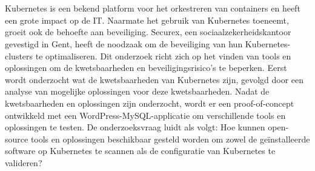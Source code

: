 
%
%
%
%
%

%



\chapter*{}

Kubernetes is een bekend platform voor het orkestreren van containers en heeft een grote impact op de IT. Naarmate het gebruik van Kubernetes toeneemt, groeit ook de behoefte aan beveiliging. Securex, een sociaalzekerheidskantoor gevestigd in Gent, heeft de noodzaak om de beveiliging van hun Kubernetes-clusters te optimaliseren. Dit onderzoek richt zich op het vinden van tools en oplossingen om de kwetsbaarheden en beveiligingsrisico's te beperken. Eerst wordt onderzocht wat de kwetsbaarheden van Kubernetes zijn, gevolgd door een analyse van mogelijke oplossingen voor deze kwetsbaarheden. Nadat de kwetsbaarheden en oplossingen zijn onderzocht, wordt er een proof-of-concept ontwikkeld met een WordPress-MySQL-applicatie om verschillende tools en oplossingen te testen. De onderzoeksvraag luidt als volgt: Hoe kunnen open-source tools en oplossingen beschikbaar gesteld worden om zowel de geïnstalleerde software op Kubernetes te scannen als de configuratie van Kubernetes te valideren? \\


